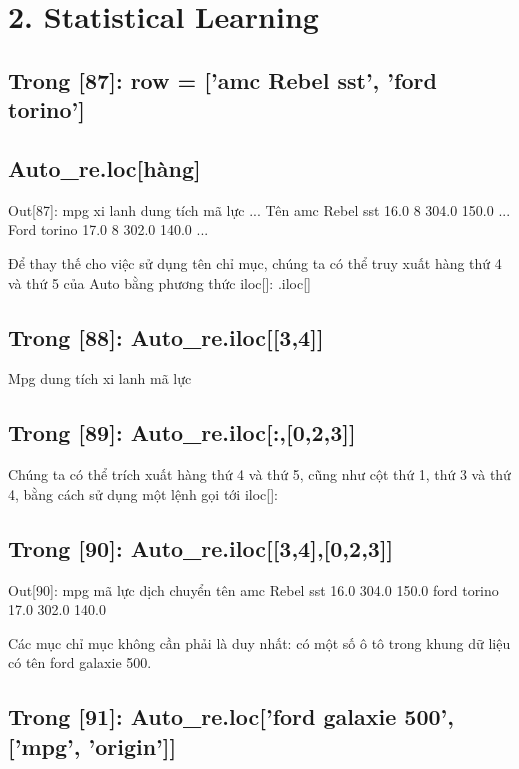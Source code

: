 \section{2. Statistical Learning}

\subsection{Trong [87]: row = ['amc Rebel sst', 'ford torino']}

\subsection{Auto\_re.loc[hàng]}

Out[87]: mpg xi lanh dung tích mã lực ... Tên amc Rebel sst 16.0 8 304.0 150.0 ... Ford torino 17.0 8 302.0 140.0 ...

Để thay thế cho việc sử dụng tên chỉ mục, chúng ta có thể truy xuất hàng thứ 4 và thứ 5 của Auto bằng phương thức iloc[]: .iloc[]

\subsection{Trong [88]: Auto\_re.iloc[[3,4]]}

Mpg dung tích xi lanh mã lực

\subsection{Trong [89]: Auto\_re.iloc[:,[0,2,3]]}

Chúng ta có thể trích xuất hàng thứ 4 và thứ 5, cũng như cột thứ 1, thứ 3 và thứ 4, bằng cách sử dụng một lệnh gọi tới iloc[]:

\subsection{Trong [90]: Auto\_re.iloc[[3,4],[0,2,3]]}

Out[90]: mpg mã lực dịch chuyển tên amc Rebel sst 16.0 304.0 150.0 ford torino 17.0 302.0 140.0

Các mục chỉ mục không cần phải là duy nhất: có một số ô tô trong khung dữ liệu có tên ford galaxie 500.

\subsection{Trong [91]: Auto\_re.loc['ford galaxie 500', ['mpg', 'origin']]}

